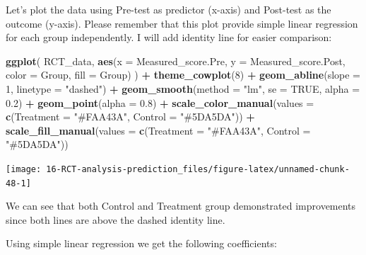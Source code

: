 \documentclass[
]{book}
\newenvironment{Shaded}{\begin{snugshade}}{\end{snugshade}}
\newcommand{\DataTypeTok}[1]{\textcolor[rgb]{0.13,0.29,0.53}{#1}}
\newcommand{\DecValTok}[1]{\textcolor[rgb]{0.00,0.00,0.81}{#1}}
\newcommand{\FloatTok}[1]{\textcolor[rgb]{0.00,0.00,0.81}{#1}}
\newcommand{\KeywordTok}[1]{\textcolor[rgb]{0.13,0.29,0.53}{\textbf{#1}}}
\newcommand{\NormalTok}[1]{#1}
\newcommand{\OperatorTok}[1]{\textcolor[rgb]{0.81,0.36,0.00}{\textbf{#1}}}
\newcommand{\OtherTok}[1]{\textcolor[rgb]{0.56,0.35,0.01}{#1}}
\newcommand{\StringTok}[1]{\textcolor[rgb]{0.31,0.60,0.02}{#1}}
\begin{document}
Let's plot the data using Pre-test as predictor (x-axis) and Post-test as the outcome (y-axis). Please remember that this plot provide simple linear regression for each group independently. I will add identity line for easier comparison:

\begin{Shaded}
\begin{Highlighting}[]
\KeywordTok{ggplot}\NormalTok{(}
\NormalTok{  RCT\_data,}
  \KeywordTok{aes}\NormalTok{(}\DataTypeTok{x =}\NormalTok{ Measured\_score.Pre, }\DataTypeTok{y =}\NormalTok{ Measured\_score.Post, }\DataTypeTok{color =}\NormalTok{ Group, }\DataTypeTok{fill =}\NormalTok{ Group)}
\NormalTok{) }\OperatorTok{+}
\StringTok{  }\KeywordTok{theme\_cowplot}\NormalTok{(}\DecValTok{8}\NormalTok{) }\OperatorTok{+}
\StringTok{  }\KeywordTok{geom\_abline}\NormalTok{(}\DataTypeTok{slope =} \DecValTok{1}\NormalTok{, }\DataTypeTok{linetype =} \StringTok{"dashed"}\NormalTok{) }\OperatorTok{+}
\StringTok{  }\KeywordTok{geom\_smooth}\NormalTok{(}\DataTypeTok{method =} \StringTok{"lm"}\NormalTok{, }\DataTypeTok{se =} \OtherTok{TRUE}\NormalTok{, }\DataTypeTok{alpha =} \FloatTok{0.2}\NormalTok{) }\OperatorTok{+}
\StringTok{  }\KeywordTok{geom\_point}\NormalTok{(}\DataTypeTok{alpha =} \FloatTok{0.8}\NormalTok{) }\OperatorTok{+}
\StringTok{  }\KeywordTok{scale\_color\_manual}\NormalTok{(}\DataTypeTok{values =} \KeywordTok{c}\NormalTok{(}\DataTypeTok{Treatment =} \StringTok{"\#FAA43A"}\NormalTok{, }\DataTypeTok{Control =} \StringTok{"\#5DA5DA"}\NormalTok{)) }\OperatorTok{+}
\StringTok{  }\KeywordTok{scale\_fill\_manual}\NormalTok{(}\DataTypeTok{values =} \KeywordTok{c}\NormalTok{(}\DataTypeTok{Treatment =} \StringTok{"\#FAA43A"}\NormalTok{, }\DataTypeTok{Control =} \StringTok{"\#5DA5DA"}\NormalTok{))}
\end{Highlighting}
\end{Shaded}

\begin{center}\texttt{[image: 16-RCT-analysis-prediction\_files/figure-latex/unnamed-chunk-48-1]} \end{center}

We can see that both Control and Treatment group demonstrated improvements since both lines are above the dashed identity line.

Using simple linear regression we get the following coefficients:
\end{document}
